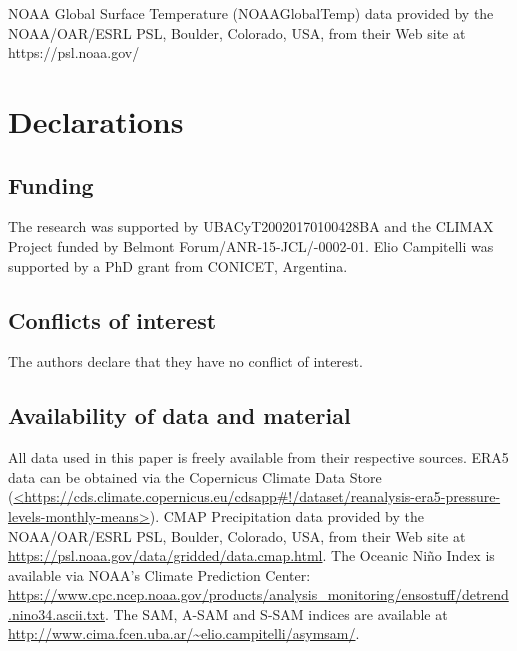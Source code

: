 \documentclass[smallextended]{svjour3}       %
\begin{document}
\begin{acknowledgements}
NOAA Global Surface Temperature (NOAAGlobalTemp) data provided by the NOAA/OAR/ESRL PSL, Boulder, Colorado, USA, from their Web site at https://psl.noaa.gov/ 
\end{acknowledgements}

\hypertarget{declarations}{%
\section*{Declarations}\label{declarations}}

\hypertarget{funding}{%
\subsection*{Funding}\label{funding}}

The research was supported by UBACyT20020170100428BA and the CLIMAX Project funded by Belmont Forum/ANR-15-JCL/-0002-01.
Elio Campitelli was supported by a PhD grant from CONICET, Argentina.

\hypertarget{conflicts-of-interest}{%
\subsection*{Conflicts of interest}\label{conflicts-of-interest}}

The authors declare that they have no conflict of interest.

\hypertarget{availability-of-data-and-material}{%
\subsection*{Availability of data and material}\label{availability-of-data-and-material}}

All data used in this paper is freely available from their respective sources.
ERA5 data can be obtained via the Copernicus Climate Data Store (\href{https://cds.climate.copernicus.eu/cdsapp\#!/dataset/reanalysis-era5-pressure-levels-monthly-means}{\textless https://cds.climate.copernicus.eu/cdsapp\#!/dataset/reanalysis-era5-pressure-levels-monthly-means\textgreater{}}).
CMAP Precipitation data provided by the NOAA/OAR/ESRL PSL, Boulder, Colorado, USA, from their Web site at \url{https://psl.noaa.gov/data/gridded/data.cmap.html}.
The Oceanic Niño Index is available via NOAA's Climate Prediction Center: \url{https://www.cpc.ncep.noaa.gov/products/analysis_monitoring/ensostuff/detrend.nino34.ascii.txt}.
The SAM, A\nobreakdash-SAM and S\nobreakdash-SAM indices are available at \url{http://www.cima.fcen.uba.ar/~elio.campitelli/asymsam/}.
\end{document}
